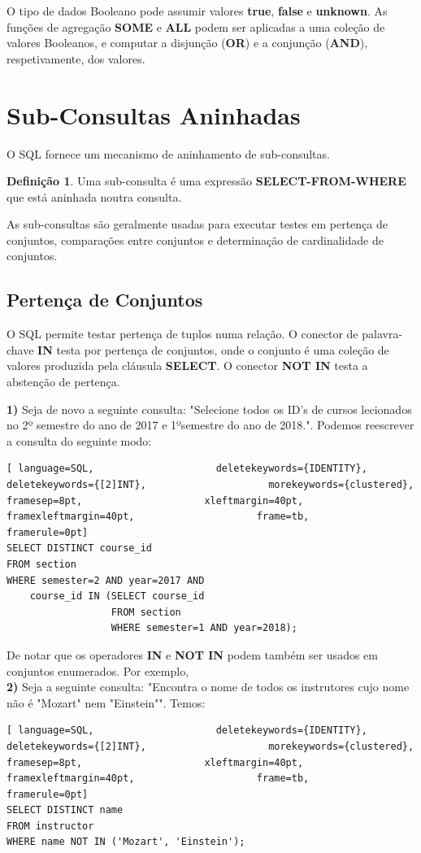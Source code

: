 \documentclass[oneside]{book}
\theoremstyle{definition}
\newtheorem{definition}{Definição}
\begin{document}
O tipo de dados Booleano pode assumir valores \textbf{true}, \textbf{false} e \textbf{unknown}. As funções de agregação \textbf{SOME} e \textbf{ALL} podem ser aplicadas a uma coleção de valores Booleanos, e computar a disjunção (\textbf{OR}) e a conjunção (\textbf{AND}), respetivamente, dos valores.

\section{Sub-Consultas Aninhadas}
O SQL fornece um mecanismo de aninhamento de sub-consultas.
\begin{definition}
    Uma sub-consulta é uma expressão \textbf{SELECT-FROM-WHERE} que está aninhada noutra consulta.
\end{definition}
As sub-consultas são geralmente usadas para executar testes em pertença de conjuntos, comparações entre conjuntos e determinação de cardinalidade de conjuntos.

\subsection{Pertença de Conjuntos}
O SQL permite testar pertença de tuplos numa relação. O conector de palavra-chave \textbf{IN} testa por pertença de conjuntos, onde o conjunto é uma coleção de valores produzida pela cláusula \textbf{SELECT}. O conector \textbf{NOT IN} testa a abstenção de pertença.

\textbf{1)} Seja de novo a seguinte consulta: "Selecione todos os ID's de cursos lecionados no 2º semestre do ano de 2017 e 1ºsemestre do ano de 2018.". Podemos reescrever a consulta do seguinte modo:
\begin{lstlisting}[ language=SQL,                     deletekeywords={IDENTITY},                     deletekeywords={[2]INT},                     morekeywords={clustered},                     framesep=8pt,                     xleftmargin=40pt,                     framexleftmargin=40pt,                     frame=tb,                     framerule=0pt]
SELECT DISTINCT course_id
FROM section
WHERE semester=2 AND year=2017 AND
    course_id IN (SELECT course_id
                  FROM section
                  WHERE semester=1 AND year=2018);
\end{lstlisting}

De notar que os operadores \textbf{IN} e \textbf{NOT IN} podem também ser usados em conjuntos enumerados. Por exemplo, \\
\textbf{2)} Seja a seguinte consulta: "Encontra o nome de todos os instrutores cujo nome não é "Mozart" nem "Einstein"". Temos:
\begin{lstlisting}[ language=SQL,                     deletekeywords={IDENTITY},                     deletekeywords={[2]INT},                     morekeywords={clustered},                     framesep=8pt,                     xleftmargin=40pt,                     framexleftmargin=40pt,                     frame=tb,                     framerule=0pt]
SELECT DISTINCT name
FROM instructor
WHERE name NOT IN ('Mozart', 'Einstein');
\end{lstlisting}
\end{document}
